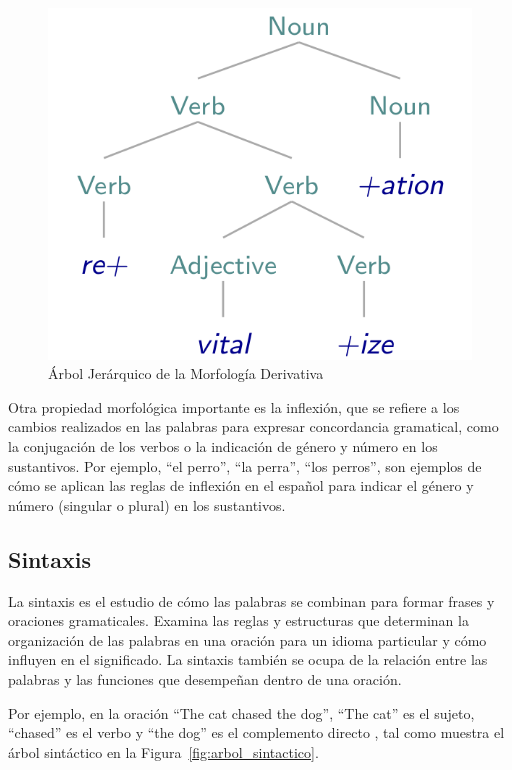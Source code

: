 \begin{figure}[h]
	\centering
	\includegraphics[scale = 0.2]{pics/morphology.png}
	\caption{Árbol Jerárquico de la Morfología Derivativa}
	\label{fig:morfo_der}
\end{figure}

Otra propiedad morfológica importante es la inflexión, que se refiere a los cambios realizados en las palabras para expresar concordancia gramatical, como la conjugación de los verbos o la indicación de género y número en los sustantivos. Por ejemplo, ``el perro'', ``la perra'', ``los perros'', son ejemplos de cómo se aplican las reglas de inflexión en el español para indicar el género y número (singular o plural) en los sustantivos.

\subsection{Sintaxis}

La sintaxis es el estudio de cómo las palabras se combinan para formar frases y oraciones gramaticales. Examina las reglas y estructuras que determinan la organización de las palabras en una oración para un idioma particular y cómo influyen en el significado. La sintaxis también se ocupa de la relación entre las palabras y las funciones que desempeñan dentro de una oración. 
\begin{example}
Por ejemplo, en la oración ``The cat chased the dog'', ``The cat'' es el sujeto, ``chased'' es el verbo y ``the dog'' es el complemento directo \cite{JohnsonMLSS}, tal como muestra el árbol sintáctico en la Figura~\ref{fig:arbol_sintactico}. 
\end{example}

